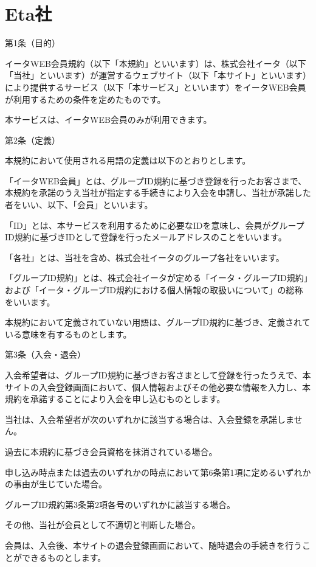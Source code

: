 \section{Eta社}
第1条（目的）

    イータWEB会員規約（以下「本規約」といいます）は、株式会社イータ（以下「当社」といいます）が運営するウェブサイト（以下「本サイト」といいます）により提供するサービス（以下「本サービス」といいます）をイータWEB会員が利用するための条件を定めたものです。

    本サービスは、イータWEB会員のみが利用できます。

第2条（定義）

本規約において使用される用語の定義は以下のとおりとします。

    「イータWEB会員」とは、グループID規約に基づき登録を行ったお客さまで、本規約を承諾のうえ当社が指定する手続きにより入会を申請し、当社が承諾した者をいい、以下、「会員」といいます。

    「ID」とは、本サービスを利用するために必要なIDを意味し、会員がグループID規約に基づきIDとして登録を行ったメールアドレスのことをいいます。

    「各社」とは、当社を含め、株式会社イータのグループ各社をいいます。

    「グループID規約」とは、株式会社イータが定める「イータ・グループID規約」および「イータ・グループID規約における個人情報の取扱いについて」の総称をいいます。

    本規約において定義されていない用語は、グループID規約に基づき、定義されている意味を有するものとします。

第3条（入会・退会）

    入会希望者は、グループID規約に基づきお客さまとして登録を行ったうえで、本サイトの入会登録画面において、個人情報およびその他必要な情報を入力し、本規約を承諾することにより入会を申し込むものとします。

    当社は、入会希望者が次のいずれかに該当する場合は、入会登録を承諾しません。

        過去に本規約に基づき会員資格を抹消されている場合。

        申し込み時点または過去のいずれかの時点において第6条第1項に定めるいずれかの事由が生じていた場合。

        グループID規約第3条第2項各号のいずれかに該当する場合。

        その他、当社が会員として不適切と判断した場合。

    会員は、入会後、本サイトの退会登録画面において、随時退会の手続きを行うことができるものとします。

